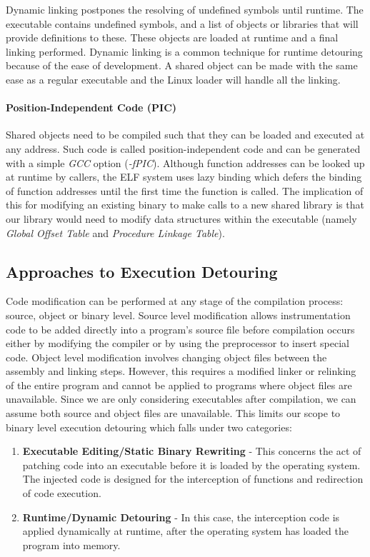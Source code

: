 Dynamic linking postpones the resolving of undefined symbols until runtime. The executable contains undefined symbols, and a list of objects or libraries that will provide definitions to these. These objects are loaded at runtime and a final linking performed. Dynamic linking is a common technique for runtime detouring because of the ease of development. A shared object can be made with the same ease as a regular executable and the Linux loader will handle all the linking.

\paragraph{Position-Independent Code (PIC)}
\label{par:PIC}

Shared objects need to be compiled such that they can be loaded and executed at any address. Such code is called position-independent code and can be generated with a simple \emph{GCC} option (\emph{-fPIC}). Although function addresses can be looked up at runtime by callers, the ELF system uses lazy binding which defers the binding of function addresses until the first time the function is called. The implication of this for modifying an existing binary to make calls to a new shared library is that our library would need to modify data structures within the executable (namely \emph{Global Offset Table} and \emph{Procedure Linkage Table}).

\subsection{Approaches to Execution Detouring}

Code modification can be performed at any stage of the compilation process: source, object or binary level. Source level modification allows instrumentation code to be added directly into a program's source file before compilation occurs either by modifying the compiler or by using the preprocessor to insert special code\cite{profiling_unix}. Object level modification involves changing object files between the assembly and linking steps\cite{purify_fast_detection}. However, this requires a modified linker or relinking of the entire program and cannot be applied to programs where object files are unavailable. Since we are only considering executables after compilation, we can assume both source and object files are unavailable. This limits our scope to binary level execution detouring which falls under two categories:

\begin{enumerate}
 \item \textbf{Executable Editing/Static Binary Rewriting} - This concerns the act of patching code into an executable before it is loaded by the operating system. The injected code is designed for the interception of functions and redirection of code execution.
 \item \textbf{Runtime/Dynamic Detouring} - In this case, the interception code is applied dynamically at runtime, after the operating system has loaded the program into memory.
\end{enumerate}

